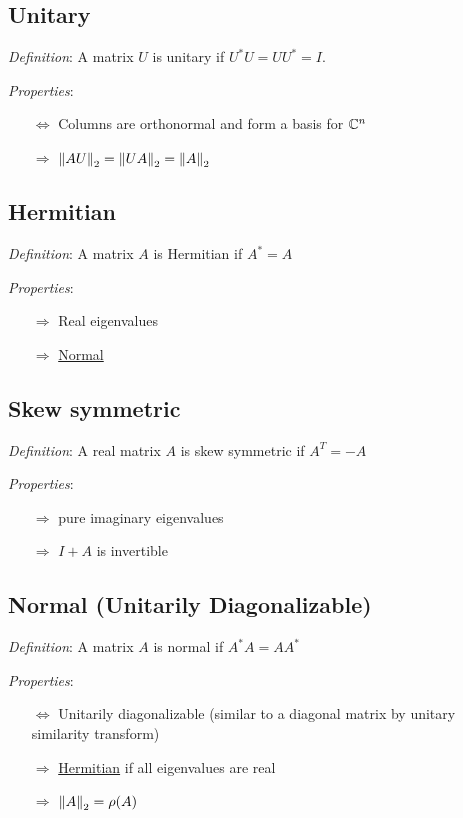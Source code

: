 \documentclass[12pt]{article}
\begin{document}
\subsection{Unitary}
\textit{Definition}: A matrix \( U \) is unitary if \( U^*U = UU^* = I  \).

\textit{Properties}:
\begin{itemize}[nolistsep]
    \item[\(\Leftrightarrow\)] Columns are orthonormal and form a basis for \( \mathbb{C}^n \)
    \item[\(\Rightarrow\)] \( \left\lVert AU\right\rVert_2 = \left\lVert UA\right\rVert_2 = \left\lVert A\right\rVert_2 \)
\end{itemize}


\subsection{Hermitian}
\label{sec:hermitian}
\textit{Definition}: A matrix \( A \) is Hermitian if \( A^* = A \)

\textit{Properties}:
\begin{itemize}[nolistsep]
    \item[\(\Rightarrow\)] Real eigenvalues
    \item[\(\Rightarrow\)] \hyperref[sec:normal]{Normal}
\end{itemize}


\subsection{Skew symmetric}
\textit{Definition}: A real matrix \( A \) is skew symmetric if \( A^T = -A \)

\textit{Properties}:
\begin{itemize}[nolistsep]
    \item[\(\Rightarrow\)] pure imaginary eigenvalues
    \item[\(\Rightarrow\)] \( I+A \) is invertible
\end{itemize}


\subsection{Normal (Unitarily Diagonalizable)}
\label{sec:normal}
\textit{Definition}: A matrix \( A \) is normal if \( A^*A = AA^* \)

\textit{Properties}:
\begin{itemize}[nolistsep]
    \item[\(\Leftrightarrow\)] Unitarily diagonalizable (similar to a diagonal matrix by unitary similarity transform)
    \item[\(\Rightarrow\)] \hyperref[sec:hermitian]{Hermitian} if all eigenvalues are real
    \item[\(\Rightarrow\)] \( \left\lVert A\right\rVert_2 = \rho(A) \)
\end{itemize}
\end{document}
